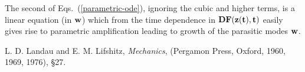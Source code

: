 
    The second of Eqs.~(\ref{parametric-ode}), ignoring the cubic and
higher terms, is a linear equation (in ${\bf w}$) which from the time
dependence in ${\bf DF({\bf z}(t),t)}$ easily gives rise to parametric
amplification \cite{LL} leading to growth of the parasitic modes
${\bf w}$.
    
 L. D. Landau and E. M. Lifshitz, {\it Mechanics},
(Pergamon Press, Oxford, 1960, 1969, 1976), \S27.


